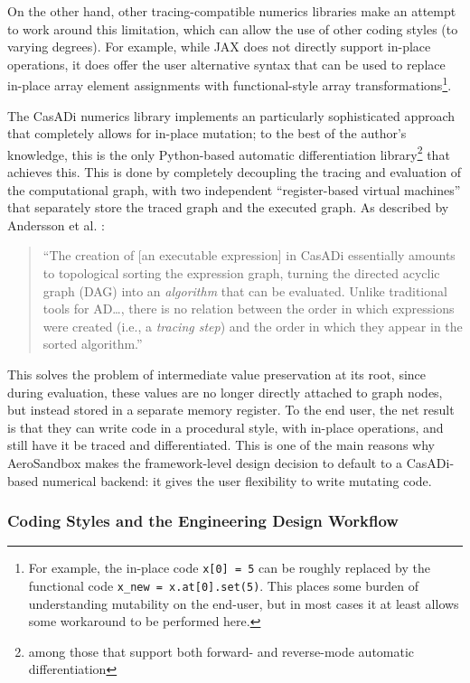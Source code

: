 On the other hand, other tracing-compatible numerics libraries make an attempt to work around this limitation, which can allow the use of other coding styles (to varying degrees). For example, while JAX \cite{jax} does not directly support in-place operations, it does offer the user alternative syntax that can be used to replace in-place array element assignments with functional-style array transformations\footnote{For example, the in-place code \texttt{x[0] = 5} can be roughly replaced by the functional code \texttt{x_new = x.at[0].set(5)}. This places some burden of understanding mutability on the end-user, but in most cases it at least allows some workaround to be performed here.}.

The CasADi numerics library implements an particularly sophisticated approach that completely allows for in-place mutation; to the best of the author's knowledge, this is the only Python-based automatic differentiation library\footnote{among those that support both forward- and reverse-mode automatic differentiation} that achieves this. This is done by completely decoupling the tracing and evaluation of the computational graph, with two independent ``register-based virtual machines'' that separately store the traced graph and the executed graph. As described by Andersson et al. \cite{andersson_casadi_2019}:

\begin{quote}
    ``The creation of [an executable expression] in CasADi essentially amounts to topological sorting the expression graph, turning the directed acyclic graph (DAG) into an \emph{algorithm} that can be evaluated. Unlike traditional tools for AD\ldots, there is no relation between the order in which expressions were created (i.e., a \emph{tracing step}) and the order in which they appear in the sorted algorithm.''
\end{quote}

\noindent This solves the problem of intermediate value preservation at its root, since during evaluation, these values are no longer directly attached to graph nodes, but instead stored in a separate memory register. To the end user, the net result is that they can write code in a procedural style, with in-place operations, and still have it be traced and differentiated. This is one of the main reasons why AeroSandbox makes the framework-level design decision to default to a CasADi-based numerical backend: it gives the user flexibility to write mutating code.

\subsubsection{Coding Styles and the Engineering Design Workflow}

